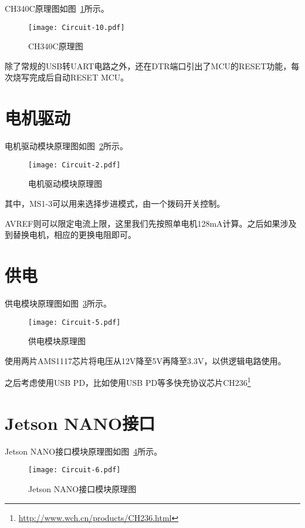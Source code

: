 CH340C原理图如图~\ref{fig:Circuit-10}所示。

\begin{figure}[htbp]
    \centering
    \texttt{[image: Circuit-10.pdf]}
    \caption{CH340C原理图}
    \label{fig:Circuit-10}
\end{figure}

除了常规的USB转UART电路之外，还在DTR端口引出了MCU的RESET功能，每次烧写完成后自动RESET MCU。

\section{电机驱动}

电机驱动模块原理图如图~\ref{fig:Circuit-2}所示。

\begin{figure}[htbp]
    \centering
    \texttt{[image: Circuit-2.pdf]}
    \caption{电机驱动模块原理图}
    \label{fig:Circuit-2}
\end{figure}

其中，MS1-3可以用来选择步进模式，由一个拨码开关控制。

AVREF则可以限定电流上限，这里我们先按照单电机128mA计算。之后如果涉及到替换电机，相应的更换电阻即可。

\section{供电}

供电模块原理图如图~\ref{fig:Circuit-5}所示。

\begin{figure}[htbp]
    \centering
    \texttt{[image: Circuit-5.pdf]}
    \caption{供电模块原理图}
    \label{fig:Circuit-5}
\end{figure}

使用两片AMS1117芯片将电压从12V降至5V再降至3.3V，以供逻辑电路使用。

之后考虑使用USB PD，比如使用USB PD等多快充协议芯片CH236\footnote{\url{http://www.wch.cn/products/CH236.html}}

\section{Jetson NANO接口}

Jetson NANO接口模块原理图如图~\ref{fig:Circuit-6}所示。

\begin{figure}[htbp]
    \centering
    \texttt{[image: Circuit-6.pdf]}
    \caption{Jetson NANO接口模块原理图}
    \label{fig:Circuit-6}
\end{figure}

